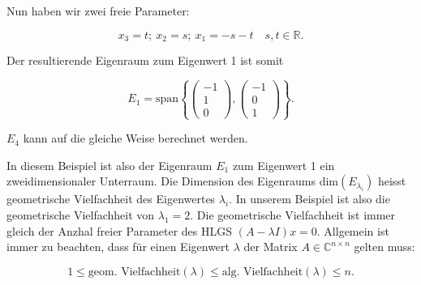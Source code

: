 \vspace{0.25\baselineskip}

Nun haben wir zwei freie Parameter:

\begin{equation*}
    x_3 = t;\ x_2 = s;\ x_1 = -s - t \quad s, t \in \mathbb{R}.
\end{equation*}

Der resultierende Eigenraum zum Eigenwert 1 ist somit

\begin{equation*}
    E_1 = \text{span} \left\{ \begin{pmatrix} -1 \\ 1 \\ 0 \end{pmatrix}, \begin{pmatrix} -1 \\ 0 \\ 1 \end{pmatrix} \right\}.
\end{equation*}

\( E_4 \) kann auf die gleiche Weise berechnet werden.

\vspace{\baselineskip}

In diesem Beispiel ist also der Eigenraum \( E_1 \) zum Eigenwert 1 ein zweidimensionaler Unterraum. Die Dimension des Eigenraums dim\( (E_{\lambda_i}) \) heisst geometrische Vielfachheit des Eigenwertes \( \lambda_i \). In unserem Beispiel ist also die geometrische Vielfachheit von \( \lambda_1 =  2 \). Die geometrische Vielfachheit ist immer gleich der Anzhal freier Parameter des HLGS \( (A - \lambda I)x = 0 \). Allgemein ist immer zu beachten, dass für einen Eigenwert \( \lambda \) der Matrix \( A \in \mathbb{C}^{n \times n} \) gelten muss:

\begin{equation*}
    1 \leq \text{geom. Vielfachheit}(\lambda) \leq \text{alg. Vielfachheit}(\lambda) \leq n.
\end{equation*}